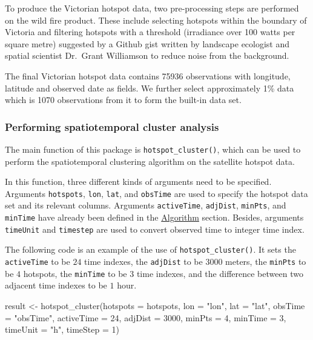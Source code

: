 To produce the Victorian hotspot data, two pre-processing steps are
performed on the wild fire product. These include selecting hotspots
within the boundary of Victoria and filtering hotspots with a threshold
(irradiance over 100 watts per square metre) suggested by a Github gist
written by landscape ecologist and spatial scientist Dr.~Grant
Williamson \citeyearpar{hotspots} to reduce noise from the background.

The final Victorian hotspot data contains 75936 observations with
longitude, latitude and observed date as fields. We further select
approximately 1\% data which is 1070 observations from it to form the
built-in data set.

\hypertarget{performing-spatiotemporal-cluster-analysis}{%
\subsubsection{Performing spatiotemporal cluster
analysis}\label{performing-spatiotemporal-cluster-analysis}}

The main function of this package is \texttt{hotspot\_cluster()}, which
can be used to perform the spatiotemporal clustering algorithm on the
satellite hotspot data.

In this function, three different kinds of arguments need to be
specified. Arguments \texttt{hotspots}, \texttt{lon}, \texttt{lat}, and
\texttt{obsTime} are used to specify the hotspot data set and its
relevant columns. Arguments \texttt{activeTime}, \texttt{adjDist},
\texttt{minPts}, and \texttt{minTime} have already been defined in the
\protect\hyperlink{algorithm}{Algorithm} section. Besides, arguments
\texttt{timeUnit} and \texttt{timestep} are used to convert observed
time to integer time index.

The following code is an example of the use of
\texttt{hotspot\_cluster()}. It sets the \texttt{activeTime} to be
\(24\) time indexes, the \texttt{adjDist} to be \(3000\) meters, the
\texttt{minPts} to be \(4\) hotspots, the \texttt{minTime} to be \(3\)
time indexes, and the difference between two adjacent time indexes to be
\(1\) hour.

\begin{Schunk}
\begin{Sinput}
result <- hotspot_cluster(hotspots = hotspots,
                          lon = "lon",
                          lat = "lat",
                          obsTime = "obsTime",
                          activeTime = 24,
                          adjDist = 3000,
                          minPts = 4,
                          minTime = 3,
                          timeUnit = "h",
                          timeStep = 1)
\end{Sinput}
\end{Schunk}

